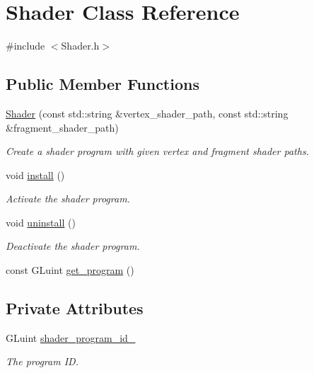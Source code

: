 \hypertarget{classShader}{}\section{Shader Class Reference}
\label{classShader}


{\ttfamily \#include $<$Shader.\+h$>$}

\subsection*{Public Member Functions}
\begin{DoxyCompactItemize}
\item 
\mbox{\hyperlink{classShader_a9f793135f05ad21d6e4e4671de688d7b}{Shader}} (const std\+::string \&vertex\+\_\+shader\+\_\+path, const std\+::string \&fragment\+\_\+shader\+\_\+path)
\begin{DoxyCompactList}\small\item\em Create a shader program with given vertex and fragment shader paths. \end{DoxyCompactList}\item 
void \mbox{\hyperlink{classShader_a8e53260be208ebf6c804a0d309e74097}{install}} ()
\begin{DoxyCompactList}\small\item\em Activate the shader program. \end{DoxyCompactList}\item 
void \mbox{\hyperlink{classShader_afa6fb33b37c9385cf62a836092da570b}{uninstall}} ()
\begin{DoxyCompactList}\small\item\em Deactivate the shader program. \end{DoxyCompactList}\item 
const G\+Luint \mbox{\hyperlink{classShader_a3d9c30f7fb8c679a7389c31e51fac596}{get\+\_\+program}} ()
\end{DoxyCompactItemize}
\subsection*{Private Attributes}
\begin{DoxyCompactItemize}
\item 
G\+Luint \mbox{\hyperlink{classShader_ab1d32c11e4114a95b484f819b950af5d}{shader\+\_\+program\+\_\+id\+\_\+}}
\begin{DoxyCompactList}\small\item\em The program ID. \end{DoxyCompactList}\end{DoxyCompactItemize}


